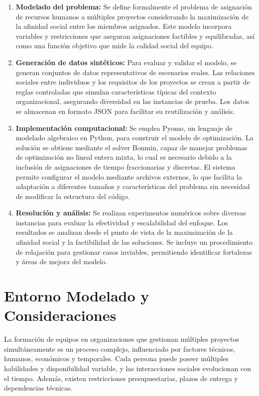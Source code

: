 \documentclass[conference]{IEEEtran}
\begin{document}
\begin{enumerate}
    \item \textbf{Modelado del problema:} Se define formalmente el problema de asignación de recursos humanos a múltiples proyectos considerando la maximización de la afinidad social entre los miembros asignados. Este modelo incorpora variables y restricciones que aseguran asignaciones factibles y equilibradas, así como una función objetivo que mide la calidad social del equipo.

    \item \textbf{Generación de datos sintéticos:} Para evaluar y validar el modelo, se generan conjuntos de datos representativos de escenarios reales. Las relaciones sociales entre individuos y los requisitos de los proyectos se crean a partir de reglas controladas que simulan características típicas del contexto organizacional, asegurando diversidad en las instancias de prueba. Los datos se almacenan en formato JSON para facilitar su reutilización y análisis.

    \item \textbf{Implementación computacional:} Se emplea Pyomo\cite{pyomo_hart2011}, un lenguaje de modelado algebraico en Python, para construir el modelo de optimización. La solución se obtiene mediante el solver Bonmin\cite{bonmin_bonami2008}, capaz de manejar problemas de optimización no lineal entera mixta, lo cual es necesario debido a la inclusión de asignaciones de tiempo fraccionarias y discretas. El sistema permite configurar el modelo mediante archivos externos, lo que facilita la adaptación a diferentes tamaños y características del problema sin necesidad de modificar la estructura del código.

    \item \textbf{Resolución y análisis:} Se realizan experimentos numéricos sobre diversas instancias para evaluar la efectividad y escalabilidad del enfoque. Los resultados se analizan desde el punto de vista de la maximización de la afinidad social y la factibilidad de las soluciones. Se incluye un procedimiento de relajación para gestionar casos inviables, permitiendo identificar fortalezas y áreas de mejora del modelo.
\end{enumerate}


\section{Entorno Modelado y Consideraciones}

La formación de equipos en organizaciones que gestionan múltiples proyectos simultáneamente es un proceso complejo, influenciado por factores técnicos, humanos, económicos y temporales. Cada persona puede poseer múltiples habilidades y disponibilidad variable, y las interacciones sociales evolucionan con el tiempo. Además, existen restricciones presupuestarias, plazos de entrega y dependencias técnicas.
\end{document}
